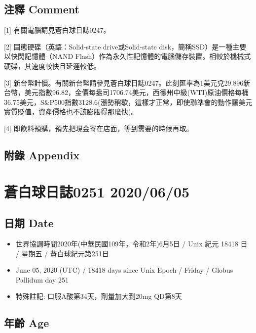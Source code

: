 \documentclass[a5paper, 11pt
]{book}
\providecommand{\tightlist}{%
  \setlength{\itemsep}{0pt}\setlength{\parskip}{0pt}}
\begin{document}
\hypertarget{ux6ce8ux91cb-comment-3}{%
\subsection{注釋 Comment}\label{ux6ce8ux91cb-comment-3}}

{[}1{]} 有關電腦請見蒼白球日誌0247。

{[}2{]} 固態硬碟（英語：Solid-state drive或Solid-state
disk，簡稱SSD）是一種主要以快閃記憶體（NAND
Flash）作為永久性記憶體的電腦儲存裝置。相較於機械式硬碟，其速度較快且延遲較低。

{[}3{]}
新台幣計價。有關新台幣請參見蒼白球日誌0247。此刻匯率為1美元兌29.896新台幣，美元指數96.82，金價每盎司1706.74美元，西德州中級(WTI)原油價格每桶36.75美元，S\&P500指數3128.6(漲勢稍歇，這樣才正常，即使聯準會的動作讓美元實質貶值，資產價格也不該膨脹得那麼快)。

{[}4{]} 即飲料預購，預先把現金寄在店面，等到需要的時候再取。

\hypertarget{ux9644ux9304-appendix-3}{%
\subsection{附錄 Appendix}\label{ux9644ux9304-appendix-3}}

\hypertarget{ux84bcux767dux7403ux65e5ux8a8c0251-20200605}{%
\section{蒼白球日誌0251
2020/06/05}\label{ux84bcux767dux7403ux65e5ux8a8c0251-20200605}}

\hypertarget{ux65e5ux671f-date-4}{%
\subsection{日期 Date}\label{ux65e5ux671f-date-4}}

\begin{itemize}
\tightlist
\item
  世界協調時間2020年(中華民國109年，令和2年)6月5日 / Unix 紀元 18418 日
  / 星期五 / 蒼白球紀元第251日
\item
  June 05, 2020 (UTC) / 18418 days since Unix Epoch / Friday / Globus
  Pallidum day 251
\item
  特殊註記: 口服A酸第34天，劑量加大到20mg QD第8天
\end{itemize}

\hypertarget{ux5e74ux9f61-age-4}{%
\subsection{年齡 Age}\label{ux5e74ux9f61-age-4}}
\end{document}
